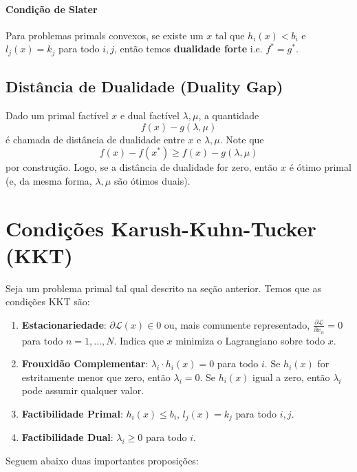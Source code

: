 \paragraph{Condição de Slater} Para problemas primals convexos, se existe um $x$ tal que $h_i(x)<b_i$ e $l_j(x)=k_j$ para todo $i,j$, então temos \textbf{dualidade forte} i.e. $f^*=g^*$.

\subsection{Distância de Dualidade (Duality Gap)}
Dado um primal factível $x$ e dual factível $\lambda, \mu$, a quantidade
\[ f(x) - g(\lambda,\mu)\]
é chamada de distância de dualidade entre $x$ e $\lambda, \mu$. Note que
\[  f(x) - f(x^*) \ge  f(x) - g(\lambda, \mu)\]
por construção. Logo, se a distância de dualidade for zero, então $x$ é ótimo primal (e, da mesma forma, $\lambda, \mu$ são ótimos duais). 
\medskip

\noindent{}
\section{Condições Karush-Kuhn-Tucker (KKT)} 
Seja um problema primal tal qual descrito na seção anterior. Temos que as condições KKT são:
\begin{enumerate}
    \item \textbf{Estacionariedade}: $\partial\mathcal{L}(x)\in0$ ou, mais comumente representado, $\frac{\partial\mathcal{L}}{\partial x_n}=0$ para todo $n=1,...,N$. Indica que $x$ minimiza o Lagrangiano sobre todo $x$.
    \item \textbf{Frouxidão Complementar}: $\lambda_i\cdot h_i(x) = 0$ para todo $i$. Se $h_i(x)$ for estritamente menor que zero, então $\lambda_i = 0$. Se $h_i(x)$ igual a zero, então $\lambda_i$ pode assumir qualquer valor.
    \item \textbf{Factibilidade Primal}: $h_i(x) \le b_i$, $l_j(x) = k_j$ para todo $i, j$.
    \item \textbf{Factibilidade Dual}: $\lambda_i\geq0$ para todo $i$.
\end{enumerate}
Seguem abaixo duas importantes proposições:
